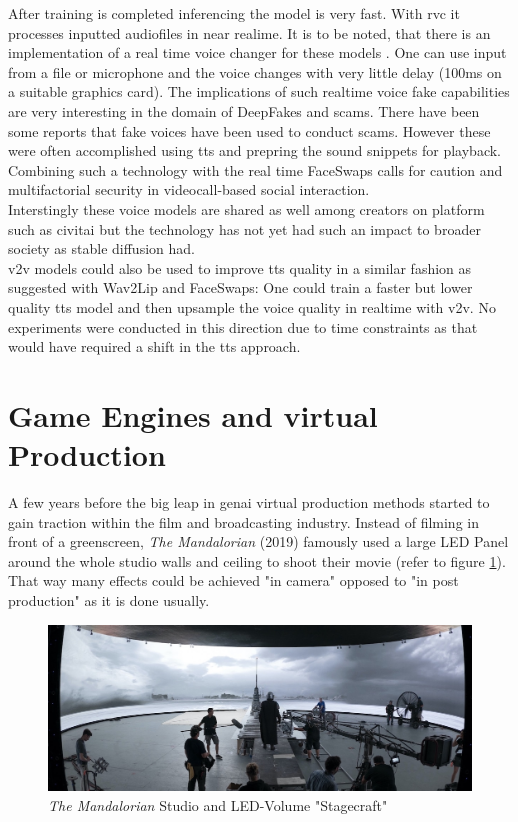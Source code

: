 \documentclass[
  a4paper,  %
  twoside,  %
  bibliography=totoc,
  headsepline,
  cleardoublepage=empty,
  parskip=half,
  draft=false
]{scrbook}
\begin{document}
After training is completed inferencing the model is very fast. With \gls{rvc} it processes inputted audiofiles in near realime. It is to be noted, that there is an implementation of a real time voice changer for these models \cite{WokadaVoicechangerVoice}. One can use input from a file or microphone and the voice changes with very little delay (100ms on a suitable graphics card). The implications of such realtime voice fake capabilities are very interesting in the domain of DeepFakes and scams. There have been some reports that fake voices have been used to conduct scams. However these were often accomplished using \gls{tts} and prepring the sound snippets for playback. Combining such a technology with the real time FaceSwaps calls for caution and multifactorial security in videocall-based social interaction. \\
Interstingly these voice models are shared as well among creators on platform such as civitai but the technology has not yet had such an impact to broader society as stable diffusion had. \\
\gls{v2v} models could also be used to improve \gls{tts} quality in a similar fashion as suggested with Wav2Lip and FaceSwaps: One could train a faster but lower quality \gls{tts} model and then upsample the voice quality in realtime with \gls{v2v}. No experiments were conducted in this direction due to time constraints as that would have required a shift in the \gls{tts} approach.

\section{Game Engines and virtual Production}
\label{sec:bg-virtual-production}
A few years before the big leap in \gls{genai} virtual production methods started to gain traction within the film and broadcasting industry. Instead of filming in front of a greenscreen, \textit{The Mandalorian} (2019) famously used a large LED Panel around the whole studio walls and ceiling to shoot their movie (refer to figure \ref{fig:mando-vps}). That way many effects could be achieved "in camera" opposed to "in post production" as it is done usually.

\begin{figure}[h]
  \centering
  \includegraphics[width=1\textwidth]{./graphics/images/mandalorian-vp.jpg}
  \caption{\textit{The Mandalorian} Studio and LED-Volume "Stagecraft" \cite{landsiedelGamechanger2021}}
  \label{fig:mando-vps}
\end{figure}
\end{document}
